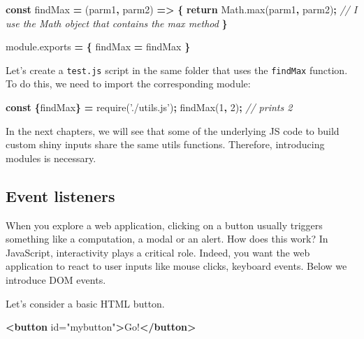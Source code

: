 \documentclass[
]{book}
\newenvironment{Shaded}{\begin{snugshade}}{\end{snugshade}}
\newcommand{\AttributeTok}[1]{\textcolor[rgb]{0.77,0.63,0.00}{#1}}
\newcommand{\CommentTok}[1]{\textcolor[rgb]{0.56,0.35,0.01}{\textit{#1}}}
\newcommand{\ControlFlowTok}[1]{\textcolor[rgb]{0.13,0.29,0.53}{\textbf{#1}}}
\newcommand{\DecValTok}[1]{\textcolor[rgb]{0.00,0.00,0.81}{#1}}
\newcommand{\KeywordTok}[1]{\textcolor[rgb]{0.13,0.29,0.53}{\textbf{#1}}}
\newcommand{\NormalTok}[1]{#1}
\newcommand{\OperatorTok}[1]{\textcolor[rgb]{0.81,0.36,0.00}{\textbf{#1}}}
\newcommand{\OtherTok}[1]{\textcolor[rgb]{0.56,0.35,0.01}{#1}}
\newcommand{\StringTok}[1]{\textcolor[rgb]{0.31,0.60,0.02}{#1}}
\newcommand{\VariableTok}[1]{\textcolor[rgb]{0.00,0.00,0.00}{#1}}
\begin{document}
\begin{Shaded}
\begin{Highlighting}[]
\KeywordTok{const}\NormalTok{ findMax }\OperatorTok{=}\NormalTok{ (parm1}\OperatorTok{,}\NormalTok{ parm2) }\KeywordTok{=>} \OperatorTok{\{}
  \ControlFlowTok{return} \VariableTok{Math}\NormalTok{.}\AttributeTok{max}\NormalTok{(parm1}\OperatorTok{,}\NormalTok{ parm2)}\OperatorTok{;} \CommentTok{// I use the Math object that contains the max method}
\OperatorTok{\}}

\VariableTok{module}\NormalTok{.}\AttributeTok{exports} \OperatorTok{=} \OperatorTok{\{}
\NormalTok{  findMax }\OperatorTok{=}\NormalTok{ findMax}
\OperatorTok{\}}
\end{Highlighting}
\end{Shaded}

Let's create a \texttt{test.js} script in the same folder that uses the \texttt{findMax} function. To do this, we need to import the corresponding module:

\begin{Shaded}
\begin{Highlighting}[]
\KeywordTok{const} \OperatorTok{\{}\NormalTok{findMax}\OperatorTok{\}} \OperatorTok{=} \AttributeTok{require}\NormalTok{(}\StringTok{'./utils.js'}\NormalTok{)}\OperatorTok{;}
\AttributeTok{findMax}\NormalTok{(}\DecValTok{1}\OperatorTok{,} \DecValTok{2}\NormalTok{)}\OperatorTok{;} \CommentTok{// prints 2}
\end{Highlighting}
\end{Shaded}

In the next chapters, we will see that some of the underlying JS code to build custom shiny inputs share the same utils functions. Therefore, introducing modules is necessary.

\hypertarget{event-listeners}{%
\subsection{Event listeners}\label{event-listeners}}

When you explore a web application, clicking on a button usually triggers something like a computation, a modal or an alert. How does this work?
In JavaScript, interactivity plays a critical role. Indeed, you want the web application to react to user inputs like mouse clicks, keyboard events. Below we introduce DOM events.

Let's consider a basic HTML button.

\begin{Shaded}
\begin{Highlighting}[]
\KeywordTok{<button}\OtherTok{ id=}\StringTok{"mybutton"}\KeywordTok{>}\NormalTok{Go!}\KeywordTok{</button>}
\end{Highlighting}
\end{Shaded}
\end{document}
